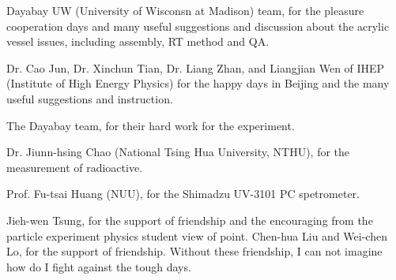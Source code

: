 \begin{acknowledgements}
Dayabay UW (University of Wisconsn at Madison) team, for the pleasure cooperation days
and many useful suggestions and discussion about the acrylic vessel issues, including assembly, RT method and QA.

Dr. Cao Jun, Dr. Xinchun Tian, Dr. Liang Zhan, and Liangjian Wen of IHEP (Institute of High Energy Physics)
for the happy days in Beijing and the many useful suggestions and instruction.

The Dayabay team, for their hard work for the experiment.

Dr. Jiunn-hsing Chao (National Tsing Hua University, NTHU), for the measurement of radioactive.

Prof. Fu-tsai Huang (NUU), for the Shimadzu UV-3101 PC spetrometer.

Jieh-wen Tsung, for the support of friendship and the encouraging from the particle experiment physics student view of point.
Chen-hua Liu and Wei-chen Lo, for the support of friendship. Without these friendship, I can not imagine how
do I fight against the tough days.








%
%
%
%
%
%
%
%
%
%
%
%
%
%
%
%
\end{acknowledgements}

